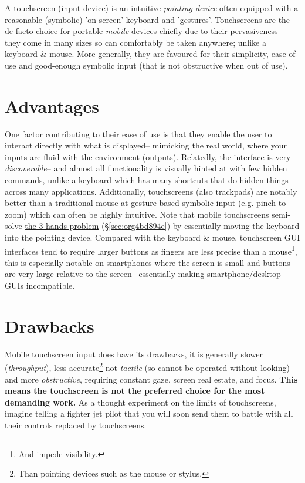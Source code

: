\documentclass[logo,bsc,singlespacing,parskip]{infthesis}
\begin{document}
A touchscreen (input device) is an intuitive  \emph{pointing device} often equipped with a reasonable (symbolic) 'on-screen' keyboard and 'gestures'.
Touchscreens are the de-facto choice for portable \emph{mobile} devices chiefly due to their pervasiveness-- they come in many sizes so can comfortably be taken anywhere; unlike a keyboard \& mouse.
More generally, they are favoured for their simplicity, ease of use and good-enough symbolic input (that is not obstructive when out of use).
\section{Advantages}
\label{sec:org4552562}
One factor contributing to their ease of use is that they enable the user to interact directly with what is displayed-- mimicking the real world, where your inputs are fluid with the environment (outputs).
Relatedly, the interface is very \emph{discoverable}-- and almost all functionality is visually hinted at with few hidden commands, unlike a keyboard which has many shortcuts that do hidden things across many applications.
Additionally, touchscreens (also trackpads) are notably better than a traditional mouse at gesture based symbolic input (e.g. pinch to zoom) which can often be highly intuitive.
Note that mobile touchscreens semi-solve \hyperref[sec:org4bd894e]{the 3 hands problem} (\S \ref{sec:org4bd894e}) by essentially moving the keyboard into the pointing device.
Compared with the keyboard \& mouse, touchscreen GUI interfaces tend to require larger buttons as fingers are less precise than a mouse\footnote{And impede visibility.}, this is especially notable on smartphones where the screen is small and buttons are very large relative to the screen-- essentially making smartphone/desktop GUIs incompatible.

\section{Drawbacks}
\label{sec:orgf3c2e36}
Mobile touchscreen input does have its drawbacks, it is generally slower (\emph{throughput}), less accurate\footnote{Than pointing devices such as the mouse or stylus.}   not \emph{tactile} (so cannot be operated without looking) and more \emph{obstructive}, requiring constant gaze, screen real estate, and focus.
\textbf{This means the touchscreen is not the preferred choice for the most demanding work.}
As a thought experiment on the limits of  touchscreens, imagine telling a fighter jet pilot that you will soon send them to battle with all their controls replaced by touchscreens.
\end{document}
